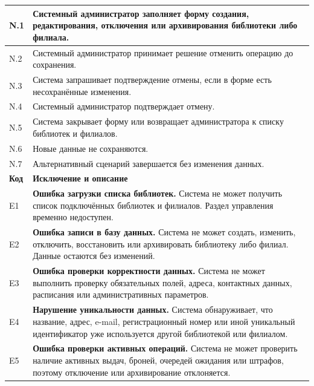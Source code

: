 \documentclass[12pt,a4paper]{article}
\begin{document}
\begin{xltabular}{\textwidth}{
				|>{\raggedright\arraybackslash}p{2.7cm}
				|>{\raggedright\arraybackslash}X|
			}
			N.1 & Системный администратор заполняет форму создания, редактирования,
			отключения или архивирования библиотеки либо филиала. \\
			\hline
			N.2 & Системный администратор принимает решение отменить операцию до
			сохранения. \\
			\hline
			N.3 & Система запрашивает подтверждение отмены, если в форме есть
			несохранённые изменения. \\
			\hline
			N.4 & Системный администратор подтверждает отмену. \\
			\hline
			N.5 & Система закрывает форму или возвращает администратора к списку
			библиотек и филиалов. \\
			\hline
			N.6 & Новые данные не сохраняются. \\
			\hline
			N.7 & Альтернативный сценарий завершается без изменения данных. \\
			\hline
			
			
			\textbf{Код} & \textbf{Исключение и описание} \\
			\hline
			
			E1 &
			\textbf{Ошибка загрузки списка библиотек.}
			Система не может получить список подключённых библиотек и филиалов.
			Раздел управления временно недоступен. \\
			\hline
			
			E2 &
			\textbf{Ошибка записи в базу данных.}
			Система не может создать, изменить, отключить, восстановить или
			архивировать библиотеку либо филиал. Данные остаются без изменений. \\
			\hline
			
			E3 &
			\textbf{Ошибка проверки корректности данных.}
			Система не может выполнить проверку обязательных полей, адреса,
			контактных данных, расписания или административных параметров. \\
			\hline
			
			E4 &
			\textbf{Нарушение уникальности данных.}
			Система обнаруживает, что название, адрес, e-mail, регистрационный
			номер или иной уникальный идентификатор уже используется другой
			библиотекой или филиалом. \\
			\hline
			
			E5 &
			\textbf{Ошибка проверки активных операций.}
			Система не может проверить наличие активных выдач, броней, очередей
			ожидания или штрафов, поэтому отключение или архивирование
			отклоняется. \\
			\hline
			

\end{xltabular}
\end{document}
